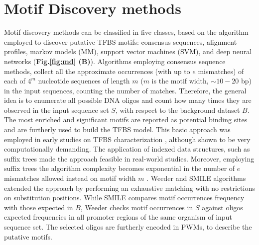 \documentclass[a4paper, titlepage, openright]{book}
\begin{document}
\section{Motif Discovery methods}
Motif discovery methods can be classified in five classes, based on the algorithm employed to discover putative TFBS motifs: consensus sequences, alignment profiles, markov models (MM), support vector machines (SVM), and deep neural networks (\textbf{Fig.\ref{fig:md} (B)}). Algorithms employing consensus sequence methods, collect all the approximate occurrences (with up to $e$ mismatches) of each of $4^{m}$ nucleotide sequences of length $m$ ($m$ is the motif width, $\sim10-20$ bp) in the input sequences, counting the number of matches. Therefore, the general idea is to enumerate all possible DNA oligos and count how many times they are observed in the input sequence set $S$, with respect to the background dataset $B$. The most enriched and significant motifs are reported as potential binding sites and are furtherly used to build the TFBS model. This basic approach was employed in early studies on TFBS characterization \citep{waterman1984pattern,galas1985rigorous}, although shown to be very computationally demanding. The application of indexed data structures, such as suffix trees \citep{valimaki2007compressed} made the approach feasible in real-world studies. Moreover, employing suffix trees the algorithm complexity becomes exponential in the number of $e$ mismatches allowed instead on motif width $m$ \citep{zambelli2013motif}. Weeder \citep{pavesi2001algorithm,pavesi2004weeder} and SMILE \citep{marsan2000algorithms} algorithms extended the approach by performing an exhaustive matching with no restrictions on substitution positions. While SMILE compares motif occurrences frequency with those expected in $B$, Weeder checks motif occurrences in $S$ against oligos expected frequencies in all promoter regions of the same organism of input sequence set. The selected oligos are furtherly encoded in PWMs, to describe the putative motifs.
\end{document}
